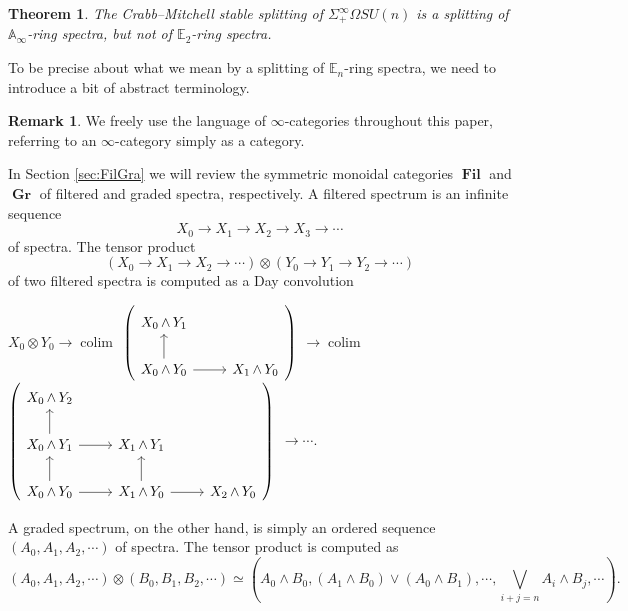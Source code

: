 \documentclass[reqno, oneside]{amsart}
\theoremstyle{definition}
\newtheorem{rmk}[nul]{Remark}
\theoremstyle{plain}
\newtheorem{thm}[nul]{Theorem}
\DeclareMathOperator*{\colim}{\text{colim}}
\DeclareMathOperator{\smsh}{\wedge}
\DeclareMathOperator{\Gr}{\textbf{Gr}}
\DeclareMathOperator{\Fil}{\textbf{Fil}}
\begin{document}
\begin{thm}
The Crabb--Mitchell stable splitting of $\Sigma^{\infty}_+ \Omega SU(n)$ is a splitting of $\mathbb{A}_\infty$-ring spectra, but not of $\mathbb{E}_2$-ring spectra.
\end{thm}

To be precise about what we mean by a splitting of $\mathbb{E}_n$-ring spectra, we need to introduce a bit of abstract terminology.

\begin{rmk}
We freely use the language of $\infty$-categories throughout this paper, referring to an $\infty$-category simply as a category.
\end{rmk}

In Section \ref{sec:FilGra} we will review the symmetric monoidal categories $\Fil$ and $\Gr$ of filtered and graded spectra, respectively.  A filtered spectrum is an infinite sequence
$$X_0 \longrightarrow X_1 \longrightarrow X_2 \longrightarrow X_3 \longrightarrow \cdots$$
of spectra.  The tensor product $$\left(X_0 \longrightarrow X_1 \longrightarrow X_2 \longrightarrow \cdots \right) \otimes \left(Y_0 \longrightarrow Y_1 \longrightarrow Y_2 \longrightarrow \cdots \right)$$
of two filtered spectra is computed as a Day convolution

\begin{center}
$X_0 \otimes Y_0 \longrightarrow \colim $
{$ \left(\begin{tikzcd} X_0 \smsh Y_1 \\  X_0 \smsh Y_0 \arrow{u} \arrow{r} & X_1 \smsh Y_0 \end{tikzcd} \right) $} 
$\longrightarrow \colim$
 {$ \left( \begin{tikzcd} X_0 \smsh Y_2 \\ X_0 \smsh Y_1 \arrow{r} \arrow{u} & X_1 \smsh Y_1  \\ X_0 \smsh Y_0 \arrow{r} \arrow{u} & X_1 \smsh Y_0 \arrow{u} \arrow{r} & X_2 \smsh Y_0 \end{tikzcd} \right) $}
$\longrightarrow \cdots.$
\end{center}

A graded spectrum, on the other hand, is simply an ordered sequence $(A_0,A_1,A_2, \cdots)$ of spectra.  The tensor product  is computed as
$$(A_0,A_1,A_2,\cdots) \otimes (B_0,B_1,B_2,\cdots) \simeq \left( A_0 \smsh B_0, (A_1 \smsh B_0) \vee (A_0 \smsh B_1), \cdots, \bigvee_{i+j=n} A_i \smsh B_j, \cdots \right).$$
\end{document}
